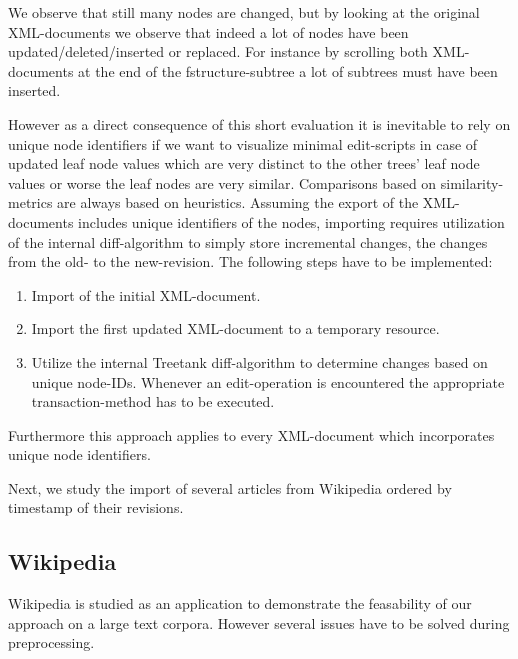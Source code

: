 We observe that still many nodes are changed, but by looking at the original XML-documents we observe that indeed a lot of nodes have been updated/deleted/inserted or replaced. For instance by scrolling both XML-documents at the end of the fstructure-subtree a lot of subtrees must have been inserted.

However as a direct consequence of this short evaluation it is inevitable to rely on unique node identifiers if we want to visualize minimal edit-scripts in case of updated leaf node values which are very distinct to the other trees' leaf node values or worse the leaf nodes are very similar. Comparisons based on similarity-metrics are always based on heuristics. Assuming the export of the XML-documents includes unique identifiers of the nodes, importing requires utilization of the internal diff-algorithm to simply store incremental changes, the changes from the old- to the new-revision. The following steps have to be implemented:

\begin{enumerate}
\item Import of the initial XML-document.
\item Import the first updated XML-document to a temporary resource.
\item Utilize the internal Treetank diff-algorithm to determine changes based on unique node-IDs. Whenever an edit-operation is encountered the appropriate transaction-method has to be executed. %
\end{enumerate}

Furthermore this approach applies to every XML-document which incorporates unique node identifiers.

Next, we study the import of several articles from Wikipedia ordered by timestamp of their revisions. 

\subsection{Wikipedia}
Wikipedia is studied as an application to demonstrate the feasability of our approach on a large text corpora. However several issues have to be solved during preprocessing.

